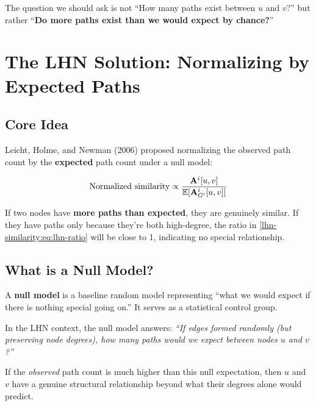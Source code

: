 \begin{notechapter}
\begin{intuition}
The question we should ask is not ``How many paths exist between $u$ and $v$?'' but rather ``\textbf{Do more paths exist than we would expect by chance?}''
\end{intuition}

\section{The LHN Solution: Normalizing by Expected Paths}

\subsection{Core Idea}

Leicht, Holme, and Newman (2006) proposed normalizing the observed path count by the \textbf{expected} path count under a null model:

\begin{equation}
\text{Normalized similarity} \propto \frac{\mathbf{A}^i[u,v]}{\mathbb{E}[\mathbf{A}_{G'}^i[u,v]]}
\label{lhn-similarity:eq:lhn-ratio}
\end{equation}

\begin{keyidea}
If two nodes have \textbf{more paths than expected}, they are genuinely similar. If they have paths only because they're both high-degree, the ratio in \cref{lhn-similarity:eq:lhn-ratio} will be close to 1, indicating no special relationship.
\end{keyidea}

\subsection{What is a Null Model?}

A \textbf{null model} is a baseline random model representing ``what we would expect if there is nothing special going on.'' It serves as a statistical control group.

\begin{keyidea}
In the LHN context, the null model answers: \emph{``If edges formed randomly (but preserving node degrees), how many paths would we expect between nodes $u$ and $v$?''}

If the \emph{observed} path count is much higher than this null expectation, then $u$ and $v$ have a genuine structural relationship beyond what their degrees alone would predict.
\end{keyidea}


\end{notechapter}

